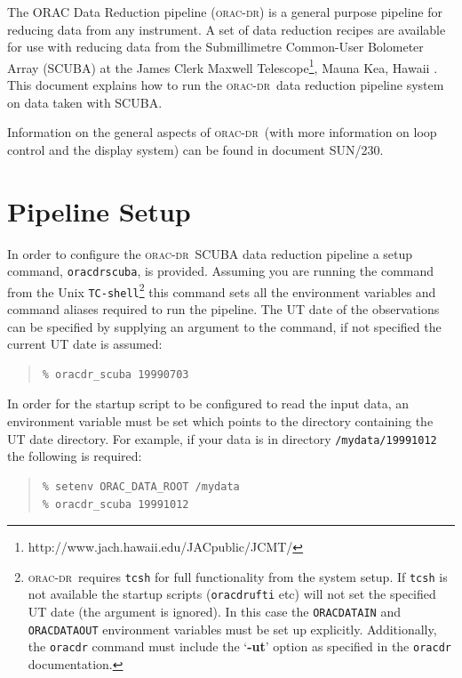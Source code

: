 \documentclass[twoside,11pt]{article}
\newcommand{\htmladdnormallinkfoot}[2]{#1\footnote{#2}}
\newcommand{\xref}[3]{#1}
\newcommand{\xlabel}[1]{}
\renewcommand{\_}{\texttt{\symbol{95}}}
\newcommand{\oracdr}{\xref{\textsc{orac-dr}}{sun230}{}}
\newcommand{\oracsun}{\xref{SUN/230}{sun230}{}}
\newenvironment{myquote}{\begin{quote}\begin{small}}{\end{small}\end{quote}}
\begin{document}
The ORAC Data Reduction pipeline (\oracdr) is a general purpose pipeline for
reducing data from any instrument. A set of data reduction recipes are
available for use with reducing data from the Submillimetre Common-User
Bolometer Array (SCUBA) \cite{mnscu} at the \htmladdnormallinkfoot{James Clerk
Maxwell Telescope}{http://www.jach.hawaii.edu/JACpublic/JCMT/}, Mauna Kea,
Hawaii .  This document explains how to run the \oracdr\ data reduction
pipeline system on data taken with SCUBA.

Information on the general aspects of \oracdr\ (with more information on loop
control and the display system) can be found in document \oracsun.




\section{Pipeline Setup\xlabel{pipeline_setup}}

In order to configure the \oracdr\ SCUBA data reduction pipeline a setup
command, \texttt{oracdr\_scuba}, is provided. Assuming you are running the
command from the Unix \texttt{TC-shell}\footnote{\oracdr\ requires
\texttt{tcsh} for full functionality from the system setup. If \texttt{tcsh}
is not available the startup scripts (\texttt{oracdr\_ufti} etc) will not set
the specified UT date (the argument is ignored). In this case the
\texttt{ORAC\_DATA\_IN} and \texttt{ORAC\_DATA\_OUT} environment variables
must be set up explicitly.  Additionally, the \texttt{oracdr} command must
include the `\textbf{-ut}' option as specified in the \texttt{oracdr}
documentation.} this command sets all the environment variables and command
aliases required to run the pipeline.  The UT date of the observations can be
specified by supplying an argument to the command, if not specified the
current UT date is assumed:

\begin{myquote}
\begin{verbatim}
% oracdr_scuba 19990703
\end{verbatim}
\end{myquote}

In order for the startup script to be configured to read the
input data, an environment variable must be set which points
to the directory containing the UT date directory. For example,
if your data is in directory \texttt{/mydata/19991012} the following
is required:

\begin{myquote}
\begin{verbatim}
% setenv ORAC_DATA_ROOT /mydata
% oracdr_scuba 19991012
\end{verbatim}
\end{myquote}
\end{document}
